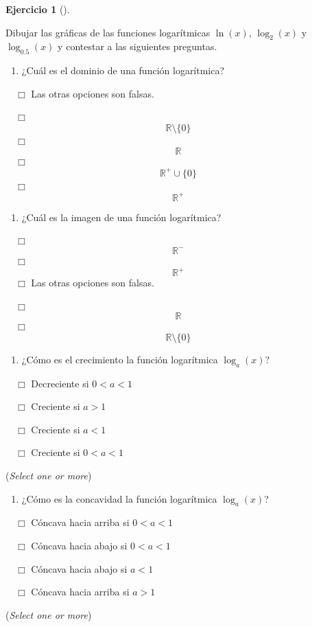 \documentclass[
  a4paper,
]{scrreport}
\providecommand{\tightlist}{%
  \setlength{\itemsep}{0pt}\setlength{\parskip}{0pt}}\usepackage{longtable,booktabs,array}
\theoremstyle{definition}
\newtheorem{exercise}{Ejercicio}[chapter]
\theoremstyle{remark}
\begin{document}
\begin{exercise}[]\protect\hypertarget{exr-funciones-logaritmicas}{}\label{exr-funciones-logaritmicas}

Dibujar las gráficas de las funciones logarítmicas \(\ln(x)\),
\(\log_2(x)\) y \(\log_{0.5}(x)\) y contestar a las siguientes
preguntas.

\begin{enumerate}
\def\labelenumi{\alph{enumi}.}
\tightlist
\item
  ¿Cuál es el dominio de una función logarítmica?
\end{enumerate}

${\quad\Box}$ Las otras opciones son falsas.

${\quad\Box}$ $$\mathbb{R}\setminus\{0\}$$
${\quad\Box}$ $$\mathbb{R}$$
${\quad\Box}$ $$\mathbb{R}^+\cup \{0\}$$
${\quad\Box}$ $$\mathbb{R}^+$$

\begin{enumerate}
\def\labelenumi{\alph{enumi}.}
\setcounter{enumi}{1}
\tightlist
\item
  ¿Cuál es la imagen de una función logarítmica?
\end{enumerate}

${\quad\Box}$ $$\mathbb{R}^-$$
${\quad\Box}$ $$\mathbb{R}^+$$
${\quad\Box}$ Las otras opciones son falsas.

${\quad\Box}$ $$\mathbb{R}$$
${\quad\Box}$ $$\mathbb{R}\setminus\{0\}$$

\begin{enumerate}
\def\labelenumi{\alph{enumi}.}
\setcounter{enumi}{2}
\tightlist
\item
  ¿Cómo es el crecimiento la función logarítmica \(\log_a(x)\)?
\end{enumerate}

${\quad\Box}$ Decreciente si $0 < a <1$

${\quad\Box}$ Creciente si $a>1$

${\quad\Box}$ Creciente si $a<1$

${\quad\Box}$ Creciente si $0 < a < 1$

(\emph{Select one or more})

\begin{enumerate}
\def\labelenumi{\alph{enumi}.}
\setcounter{enumi}{3}
\tightlist
\item
  ¿Cómo es la concavidad la función logarítmica \(\log_a(x)\)?
\end{enumerate}

${\quad\Box}$ Cóncava hacia arriba si $0 < a < 1$

${\quad\Box}$ Cóncava hacia abajo si $0 < a < 1$

${\quad\Box}$ Cóncava hacia abajo si $a<1$

${\quad\Box}$ Cóncava hacia arriba si $a>1$

(\emph{Select one or more})

\end{exercise}
\end{document}

